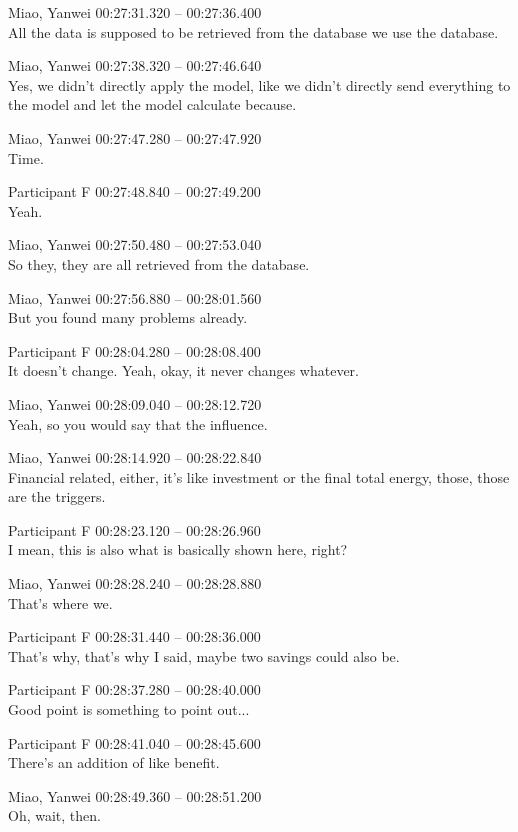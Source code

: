 {Miao, Yanwei 00:27:31.320 -- 00:27:36.400 \\
All the data is supposed to be retrieved from the database we use the database.

Miao, Yanwei 00:27:38.320 -- 00:27:46.640 \\
Yes, we didn't directly apply the model, like we didn't directly send everything to the model and let the model calculate because.

Miao, Yanwei 00:27:47.280 -- 00:27:47.920 \\
Time.

Participant F 00:27:48.840 -- 00:27:49.200 \\
Yeah.

Miao, Yanwei 00:27:50.480 -- 00:27:53.040 \\
So they, they are all retrieved from the database.

Miao, Yanwei 00:27:56.880 -- 00:28:01.560 \\
But you found many problems already.

Participant F 00:28:04.280 -- 00:28:08.400 \\
It doesn't change. Yeah, okay, it never changes whatever.

Miao, Yanwei 00:28:09.040 -- 00:28:12.720 \\
Yeah, so you would say that the influence.

Miao, Yanwei 00:28:14.920 -- 00:28:22.840 \\
Financial related, either, it's like investment or the final total energy, those, those are the triggers.

Participant F 00:28:23.120 -- 00:28:26.960 \\
I mean, this is also what is basically shown here, right?

Miao, Yanwei 00:28:28.240 -- 00:28:28.880 \\
That's where we.

Participant F 00:28:31.440 -- 00:28:36.000 \\
That's why, that's why I said, maybe two savings could also be.

Participant F 00:28:37.280 -- 00:28:40.000 \\
Good point is something to point out...

Participant F 00:28:41.040 -- 00:28:45.600 \\
There's an addition of like benefit.

Miao, Yanwei 00:28:49.360 -- 00:28:51.200 \\
Oh, wait, then.

}
